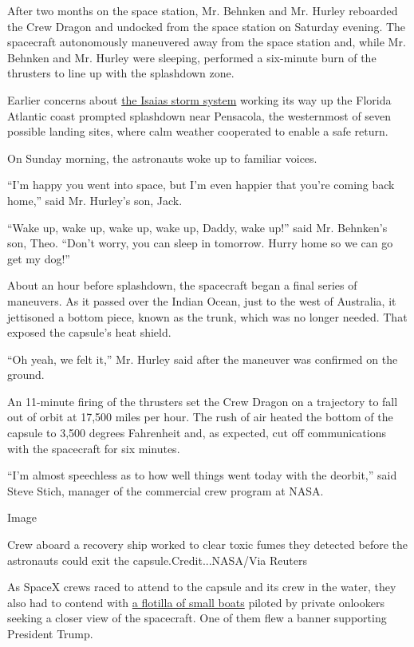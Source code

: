 After two months on the space station, Mr. Behnken and Mr. Hurley
reboarded the Crew Dragon and undocked from the space station on
Saturday evening. The spacecraft autonomously maneuvered away from the
space station and, while Mr. Behnken and Mr. Hurley were sleeping,
performed a six-minute burn of the thrusters to line up with the
splashdown zone.

Earlier concerns about
\href{https://www.nytimes.com/2020/08/02/us/Hurricane-Isaias-track.html}{the
Isaias storm system} working its way up the Florida Atlantic coast
prompted splashdown near Pensacola, the westernmost of seven possible
landing sites, where calm weather cooperated to enable a safe return.

On Sunday morning, the astronauts woke up to familiar voices.

``I'm happy you went into space, but I'm even happier that you're coming
back home,'' said Mr. Hurley's son, Jack.

``Wake up, wake up, wake up, wake up, Daddy, wake up!'' said Mr.
Behnken's son, Theo. ``Don't worry, you can sleep in tomorrow. Hurry
home so we can go get my dog!''

About an hour before splashdown, the spacecraft began a final series of
maneuvers. As it passed over the Indian Ocean, just to the west of
Australia, it jettisoned a bottom piece, known as the trunk, which was
no longer needed. That exposed the capsule's heat shield.

``Oh yeah, we felt it,'' Mr. Hurley said after the maneuver was
confirmed on the ground.

An 11-minute firing of the thrusters set the Crew Dragon on a trajectory
to fall out of orbit at 17,500 miles per hour. The rush of air heated
the bottom of the capsule to 3,500 degrees Fahrenheit and, as expected,
cut off communications with the spacecraft for six minutes.

``I'm almost speechless as to how well things went today with the
deorbit,'' said Steve Stich, manager of the commercial crew program at
NASA.

Image

Crew aboard a recovery ship worked to clear toxic fumes they detected
before the astronauts could exit the capsule.Credit...NASA/Via Reuters

As SpaceX crews raced to attend to the capsule and its crew in the
water, they also had to contend with
\href{https://www.nytimes.com/2020/08/02/us/flag-boat-SpaceX.html}{a
flotilla of small boats} piloted by private onlookers seeking a closer
view of the spacecraft. One of them flew a banner supporting President
Trump.

